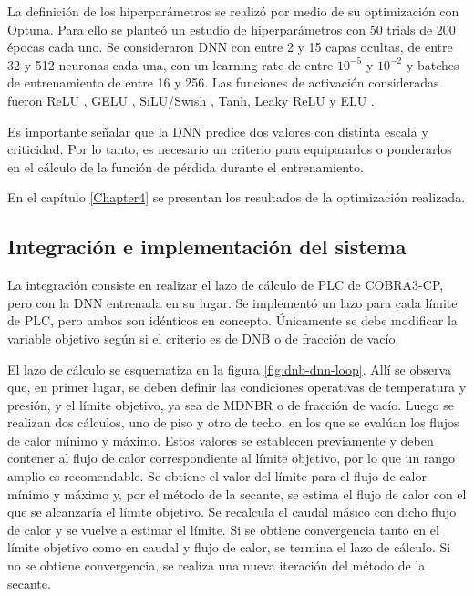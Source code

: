 La definición de los hiperparámetros se realizó por medio de su optimización con Optuna. Para ello se planteó un estudio de hiperparámetros con 50 trials de 200 épocas cada uno. Se consideraron DNN con entre 2 y 15 capas ocultas, de entre 32 y 512 neuronas cada una, con un learning rate de entre $10^{-5}$ y $10^{-2}$ y batches de entrenamiento de entre 16 y 256.
Las funciones de activación consideradas fueron ReLU \citep{nair2010rectified}, GELU \citep{hendrycks2016gaussian}, SiLU/Swish \citep{elfwing2018sigmoid}, Tanh, Leaky ReLU \citep{maas2013rectifier} y ELU \citep{clevert2015fast}.

Es importante señalar que la DNN predice dos valores con distinta escala y criticidad. Por lo tanto, es necesario un criterio para equipararlos o ponderarlos en el cálculo de la función de pérdida durante el entrenamiento.

En el capítulo \ref{Chapter4} se presentan los resultados de la optimización realizada.

\subsection{Integración e implementación del sistema}
\label{sec:plc_integracion}
La integración consiste en realizar el lazo de cálculo de PLC de COBRA3-CP, pero con la DNN entrenada en su lugar. Se implementó un lazo para cada límite de PLC, pero ambos son idénticos en concepto. Únicamente se debe modificar la variable objetivo según si el criterio es de DNB o de fracción de vacío.

El lazo de cálculo se esquematiza en la figura \ref{fig:dnb-dnn-loop}. Allí se observa que, en primer lugar, se deben definir las condiciones operativas de temperatura y presión, y el límite objetivo, ya sea de MDNBR o de fracción de vacío. Luego se realizan dos cálculos, uno de piso y otro de techo, en los que se evalúan los flujos de calor mínimo y máximo. Estos valores se establecen previamente y deben contener al flujo de calor correspondiente al límite objetivo, por lo que un rango amplio es recomendable. Se obtiene el valor del límite para el flujo de calor mínimo y máximo y, por el método de la secante, se estima el flujo de calor con el que se alcanzaría el límite objetivo. Se recalcula el caudal másico con dicho flujo de calor y se vuelve a estimar el límite. Si se obtiene convergencia tanto en el límite objetivo como en caudal y flujo de calor, se termina el lazo de cálculo. Si no se obtiene convergencia, se realiza una nueva iteración del método de la secante.

